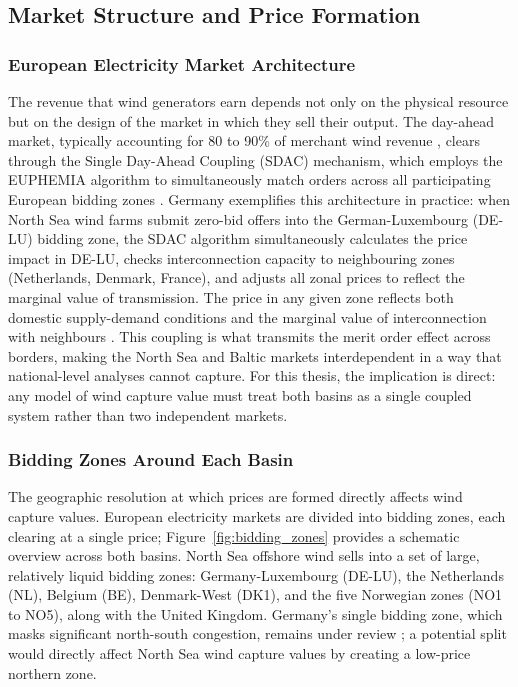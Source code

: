 \subsection{Market Structure and Price Formation}\label{sec:market_structure}

\subsubsection{European Electricity Market Architecture}\label{sec:market_architecture}

The revenue that wind generators earn depends not only on the physical resource but on the design of the market in which they sell their output. The day-ahead market, typically accounting for 80 to 90\% of merchant wind revenue \cite{Jansen2020}, clears through the Single Day-Ahead Coupling (SDAC) mechanism, which employs the EUPHEMIA algorithm to simultaneously match orders across all participating European bidding zones \cite{EUPHEMIA2020}. Germany exemplifies this architecture in practice: when North Sea wind farms submit zero-bid offers into the German-Luxembourg (DE-LU) bidding zone, the SDAC algorithm simultaneously calculates the price impact in DE-LU, checks interconnection capacity to neighbouring zones (Netherlands, Denmark, France), and adjusts all zonal prices to reflect the marginal value of transmission. The price in any given zone reflects both domestic supply-demand conditions and the marginal value of interconnection with neighbours \cite{EUPHEMIA2020, Newbery2018}. This coupling is what transmits the merit order effect across borders, making the North Sea and Baltic markets interdependent in a way that national-level analyses cannot capture. For this thesis, the implication is direct: any model of wind capture value must treat both basins as a single coupled system rather than two independent markets.

\subsubsection{Bidding Zones Around Each Basin}\label{sec:bidding_zones}

The geographic resolution at which prices are formed directly affects wind capture values. European electricity markets are divided into bidding zones, each clearing at a single price; Figure~\ref{fig:bidding_zones} provides a schematic overview across both basins. North Sea offshore wind sells into a set of large, relatively liquid bidding zones: Germany-Luxembourg (DE-LU), the Netherlands (NL), Belgium (BE), Denmark-West (DK1), and the five Norwegian zones (NO1 to NO5), along with the United Kingdom. Germany's single bidding zone, which masks significant north-south congestion, remains under review \cite{Egerer2015, GermanBZSplit2024}; a potential split would directly affect North Sea wind capture values by creating a low-price northern zone.

